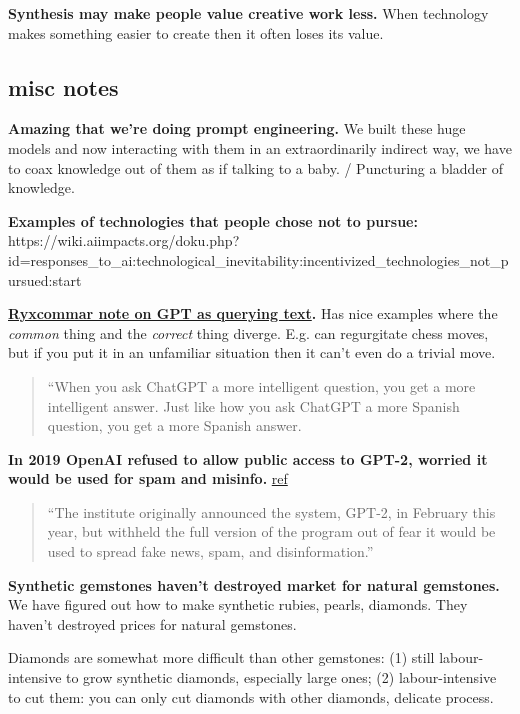 \documentclass[
  11pt,
  letterpaper,
  DIV=11,
  numbers=noendperiod,
  oneside]{scrartcl}
\begin{document}
\textbf{Synthesis may make people value creative work less.} When
technology makes something easier to create then it often loses its
value.

\hypertarget{misc-notes}{%
\subsection{misc notes}\label{misc-notes}}

\textbf{Amazing that we're doing prompt engineering.} We built these
huge models and now interacting with them in an extraordinarily indirect
way, we have to coax knowledge out of them as if talking to a baby. /
Puncturing a bladder of knowledge.

\textbf{Examples of technologies that people chose not to pursue:}
https://wiki.aiimpacts.org/doku.php?id=responses\_to\_ai:technological\_inevitability:incentivized\_technologies\_not\_pursued:start

\textbf{\href{https://ryxcommar.com/2023/03/28/chatgpt-as-a-query-engine-on-a-giant-corpus-of-text/}{Ryxcommar
note on GPT as querying text}.} Has nice examples where the
\emph{common} thing and the \emph{correct} thing diverge. E.g. can
regurgitate chess moves, but if you put it in an unfamiliar situation
then it can't even do a trivial move.

\begin{quote}
``When you ask ChatGPT a more intelligent question, you get a more
intelligent answer. Just like how you ask ChatGPT a more Spanish
question, you get a more Spanish answer.
\end{quote}

\textbf{In 2019 OpenAI refused to allow public access to GPT-2, worried
it would be used for spam and misinfo.}
\href{https://www.theverge.com/2019/11/7/20953040/openai-text-generation-ai-gpt-2-full-model-release-1-5b-parameters}{ref}

\begin{quote}
``The institute originally announced the system, GPT-2, in February this
year, but withheld the full version of the program out of fear it would
be used to spread fake news, spam, and disinformation.''
\end{quote}

\textbf{Synthetic gemstones haven't destroyed market for natural
gemstones.} We have figured out how to make synthetic rubies, pearls,
diamonds. They haven't destroyed prices for natural gemstones.

Diamonds are somewhat more difficult than other gemstones: (1) still
labour-intensive to grow synthetic diamonds, especially large ones; (2)
labour-intensive to cut them: you can only cut diamonds with other
diamonds, delicate process.
\end{document}
